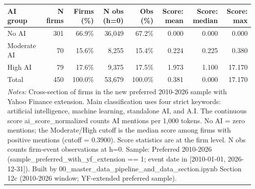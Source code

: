 \begin{tabular}{lrrrrrrr}
\toprule
AI group & N firms & Firms (\%) & N obs (h=0) & Obs (\%) & Score: mean & Score: median & Score: max \\
\midrule
No AI & 301 & 66.9\% & 36,049 & 67.2\% & 0.000 & 0.000 & 0.000 \\
Moderate AI & 70 & 15.6\% & 8,255 & 15.4\% & 0.224 & 0.225 & 0.380 \\
High AI & 79 & 17.6\% & 9,375 & 17.5\% & 1.973 & 1.100 & 17.170 \\
Total & 450 & 100.0\% & 53,679 & 100.0\% & 0.381 & 0.000 & 17.170 \\
\bottomrule
\multicolumn{8}{p{0.95\linewidth}}{\footnotesize \textit{Notes:} Cross-section of firms in the new preferred 2010-2026 sample with Yahoo Finance extension. Main classification uses four strict keywords: artificial intelligence, machine learning, standalone AI, and A.I. The continuous score ai\_score\_normalized counts AI mentions per 1,000 tokens. No AI = zero mentions; the Moderate/High cutoff is the median score among firms with positive mentions (cutoff = 0.3900). Score statistics are at the firm level. N obs counts firm-event observations at h=0. Sample: Preferred 2010-2026 (sample\_preferred\_with\_yf\_extension == 1; event date in [2010-01-01, 2026-12-31]). Built by 00\_master\_data\_pipeline\_and\_data\_section.ipynb Section 12c (2010-2026 window; YF-extended preferred sample).} \\
\end{tabular}
